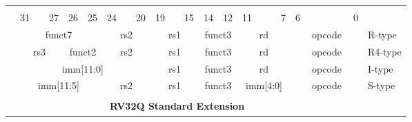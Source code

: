 \begin{table}[p]
\begin{small}
\begin{center}
    \begin{tabular} {p{0.002in}p{0.002in}p{0.002in}p{0.002in}p{0.002in}p{0.002in}p{0.002in}p{0.002in}p{0.002in}p{0.002in}p{0.002in}p{0.002in}p{0.002in}p{0.002in}p{0.002in}p{0.002in}p{0.002in}p{0.002in}p{0.002in}p{0.002in}p{0.002in}p{0.002in}p{0.002in}p{0.002in}p{0.002in}p{0.002in}p{0.002in}p{0.002in}p{0.002in}p{0.002in}p{0.002in}p{0.002in}p{0.002in}l}
    & & & & & & & & & & & & & & & & & & & & & & & & & & & & & & & & \\

            &

    \multicolumn{3}{l}{31} &
    \multicolumn{2}{r}{27} &
    \multicolumn{1}{c}{26} &
    \multicolumn{1}{r}{25} &
    \multicolumn{3}{l}{24} &
    \multicolumn{2}{r}{20} &
    \multicolumn{3}{l}{19} &
    \multicolumn{2}{r}{15} &
    \multicolumn{2}{l}{14} &
    \multicolumn{1}{r}{12} &
    \multicolumn{4}{l}{11} &
    \multicolumn{1}{r}{7} &
    \multicolumn{6}{l}{6} &
    \multicolumn{1}{r}{0} \\
    \cline{2-33}
&


\multicolumn{7}{|c|}{funct7} &
\multicolumn{5}{c|}{rs2} &
\multicolumn{5}{c|}{rs1} &
\multicolumn{3}{c|}{funct3} &
\multicolumn{5}{c|}{rd} &
\multicolumn{7}{|c|}{opcode} & R-type \\
\cline{2-33}
&

\multicolumn{5}{|c|}{rs3} &
\multicolumn{2}{c|}{funct2} &
\multicolumn{5}{c|}{rs2} &
\multicolumn{5}{c|}{rs1} &
\multicolumn{3}{c|}{funct3} &
\multicolumn{5}{c|}{rd} &
\multicolumn{7}{|c|}{opcode} & R4-type \\
\cline{2-33}
&

\multicolumn{12}{|c|}{imm[11:0]} &
\multicolumn{5}{c|}{rs1} &
\multicolumn{3}{c|}{funct3} &
\multicolumn{5}{c|}{rd} &
\multicolumn{7}{|c|}{opcode} & I-type \\
\cline{2-33}
&

\multicolumn{7}{|c|}{imm[11:5]} &
\multicolumn{5}{c|}{rs2} &
\multicolumn{5}{c|}{rs1} &
\multicolumn{3}{c|}{funct3} &
\multicolumn{5}{c|}{imm[4:0]} &
\multicolumn{7}{|c|}{opcode} & S-type \\
\cline{2-33}
&




\multicolumn{32}{c}{} & \\
\multicolumn{32}{c}{\bf RV32Q Standard Extension } & \\
\cline{2-33}


\end{tabular}
\end{center}
\end{small}
\end{table}
